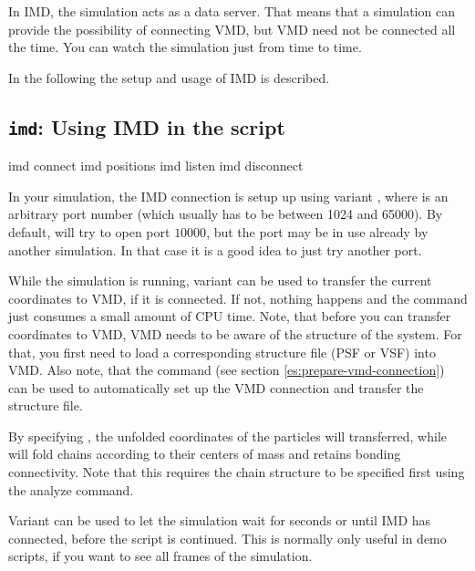 In IMD, the simulation acts as a data server. That means that a
simulation can provide the possibility of connecting VMD, but VMD need
not be connected all the time. You can watch the simulation just from
time to time.

In the following the setup and usage of IMD is described.

\subsection{\texttt{imd}: Using IMD in the script}

\begin{essyntax}
   imd connect 
   imd positions 
   imd listen 
   imd disconnect
\end{essyntax}

In your simulation, the IMD connection is setup up using variant
, where  is an arbitrary port number (which
usually has to be between 1024 and 65000). By default, \es will try to
open port $10000$, but the port may be in use already by another \es
simulation. In that case it is a good idea to just try another port.

While the simulation is running, variant  can be used to
transfer the current coordinates to VMD, if it is connected.  If not,
nothing happens and the command just consumes a small amount of CPU
time. Note, that before you can transfer coordinates to VMD, VMD needs
to be aware of the structure of the system. For that, you first need
to load a corresponding structure file (PSF or VSF) into VMD. Also
note, that the command  (see section
\vref{es:prepare-vmd-connection}) can be used to automatically set up
the VMD connection and transfer the structure file.

By specifying , the unfolded coordinates of the
particles will transferred, while  will fold chains
according to their centers of mass and retains bonding connectivity.
Note that this requires the chain structure to be specified first
using the analyze command.

Variant  can be used to let the simulation wait for
 seconds or until IMD has connected, before the script is
continued. This is normally only useful in demo scripts, if you want
to see all frames of the simulation.

